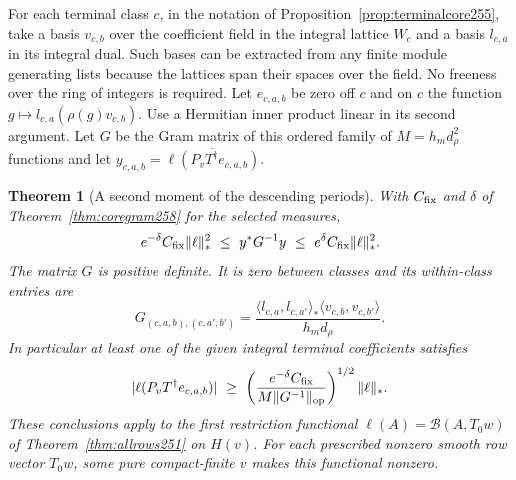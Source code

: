 \documentclass[a4paper,11pt]{article}
\newtheorem{theorem}[proposition]{Theorem}
\theoremstyle{definition}
\theoremstyle{remark}
\numberwithin{equation}{section}
\begin{document}
For each terminal class \(c\), in the notation of
Proposition~\ref{prop:terminalcore255}, take a basis \(v_{c,b}\)
over the coefficient field in the integral lattice \(W_c\) and
a basis \(l_{c,a}\) in its integral dual. Such bases can be
extracted from any finite module generating lists because
the lattices span their spaces over the field. No freeness
over the ring of integers is required. Let \(e_{c,a,b}\) be
zero off \(c\) and on \(c\) the function
\(g\mapsto l_{c,a}(\rho(g)v_{c,b})\).
Use a Hermitian inner product linear in its second argument.
Let \(G\) be the Gram matrix of this ordered family of
\(M=h_m d_\rho^2\) functions and let
\(y_{c,a,b}=\overline{\ell(P_v T^\dagger e_{c,a,b})}\).

\begin{theorem}[A second moment of the descending periods]\leavevmode
\label{thm:moment258}
With \(C_{\rm fix}\) and \(\delta\) of Theorem~\ref{thm:coregram258}
for the selected measures,
\[
  e^{-\delta} C_{\rm fix}\|\ell\|_*^2
       \ \le\ y^*G^{-1}y\
       \le\ e^\delta C_{\rm fix}\|\ell\|_*^2 .
\]
The matrix \(G\) is positive definite. It is zero between classes
and its within-class entries are
\[
 G_{(c,a,b),(c,a',b')}=
 \frac{\langle l_{c,a},l_{c,a'}\rangle_*
       \langle v_{c,b},v_{c,b'}\rangle}
      {h_m d_\rho}.
\]
In particular at least one of the given integral terminal
coefficients satisfies
\[
 |\ell(P_vT^\dagger e_{c,a,b})|
 \ \ge\
 \left(\frac{e^{-\delta} C_{\rm fix}}
 {M\|G^{-1}\|_{\rm op}}\right)^{1/2}\|\ell\|_* .
\]
These conclusions apply to the first restriction functional
\(\ell(A)=\mathcal B(A,T_0w)\) of Theorem~\ref{thm:allrows251}
on \(H(v)\). For each prescribed nonzero smooth row vector
\(T_0w\), some pure compact-finite \(v\) makes this functional
nonzero.
\end{theorem}
\end{document}
